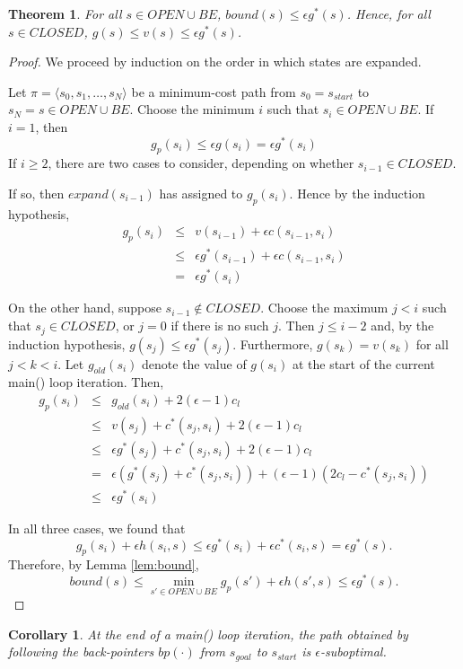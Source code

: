 \documentclass[letterpaper]{article}
\newtheorem{thm}{Theorem}
\newtheorem{cor}{Corollary}
\begin{document}
\begin{thm}
\label{thm:subopt}
For all $s\in OPEN\cup BE$, $bound(s) \le \epsilon g^*(s)$. Hence, for all $s\in CLOSED$, $g(s) \le v(s) \le \epsilon g^*(s)$.
\end{thm}

\begin{proof}
We proceed by induction on the order in which states are expanded.

Let $\pi = \langle s_0,s_1,\ldots,s_N \rangle$ be a minimum-cost path from $s_0 = s_{start}$ to $s_N = s\in OPEN\cup BE$. Choose the minimum $i$ such that $s_i\in OPEN\cup BE$. If $i = 1$, then
\[g_p(s_i) \le \epsilon g(s_i) = \epsilon g^*(s_i)\]
If $i \ge 2$, there are two cases to consider, depending on whether $s_{i-1}\in CLOSED$.

If so, then $expand(s_{i-1})$ has assigned to $g_p(s_i)$. Hence by the induction hypothesis,
\begin{eqnarray*}
g_p(s_i) &\le& v(s_{i-1}) + \epsilon c(s_{i-1},s_i)
\\&\le& \epsilon g^*(s_{i-1}) + \epsilon c(s_{i-1},s_i)
\\&=& \epsilon g^*(s_i)
\end{eqnarray*}

On the other hand, suppose $s_{i-1}\notin CLOSED$. Choose the maximum $j<i$ such that $s_j\in CLOSED$, or $j=0$ if there is no such $j$. Then $j\le i-2$ and, by the induction hypothesis, $g(s_j)\le \epsilon g^*(s_j)$. Furthermore, $g(s_k) = v(s_k)$ for all $j<k<i$. Let $g_{old}(s_i)$ denote the value of $g(s_i)$ at the start of the current main() loop iteration. Then,
\begin{eqnarray*}
g_p(s_i) &\le& g_{old}(s_i) + 2(\epsilon-1)c_l
\\&\le& v(s_j) + c^*(s_j,s_i) + 2(\epsilon-1)c_l
\\&\le& \epsilon g^*(s_j) + c^*(s_j,s_i) + 2(\epsilon-1)c_l
\\&=& \epsilon (g^*(s_j) + c^*(s_j,s_i)) + (\epsilon-1)(2c_l - c^*(s_j,s_i))
\\&\le& \epsilon g^*(s_i)
\end{eqnarray*}

In all three cases, we found that
\[g_p(s_i) + \epsilon h(s_i,s) \le \epsilon g^*(s_i) + \epsilon c^*(s_i,s) = \epsilon g^*(s).\]
Therefore, by Lemma \ref{lem:bound},
\[bound(s) \le \min_{s' \in OPEN \cup BE} g_p(s') + \epsilon h(s',s) \le \epsilon g^*(s).\]
\end{proof}

\begin{cor}
\label{cor:subopt}
At the end of a main() loop iteration, the path obtained by following the back-pointers $bp(\cdot)$ from $s_{goal}$ to $s_{start}$ is $\epsilon$-suboptimal.
\end{cor}
\end{document}
